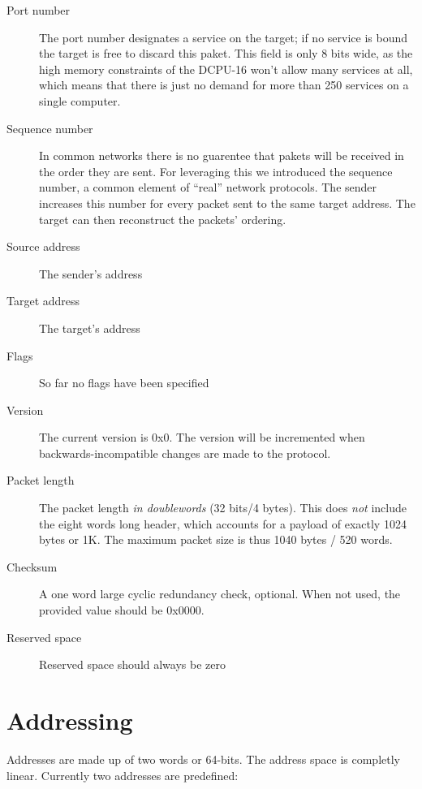 \documentclass[12pt,a4paper,english,DIV=15,oneside,parskip=half]{scrartcl}
\begin{document}
\begin{description}
\item[Port number] The port number designates a service on the target; if no service is bound the target is free to discard this paket. This field is only 8 bits wide, as the high memory constraints of the DCPU-16 won\rq{}t allow many services at all, which means that there is just no demand for more than 250 services on a single computer.

\item[Sequence number] In common networks there is no guarentee that pakets will be received in the order they are sent. For leveraging this we introduced the sequence number, a common element of \enquote{real} network protocols. The sender increases this number for every packet sent to the same target address. The target can then reconstruct the packets\rq{} ordering.

\item[Source address] The sender\rq{}s address

\item[Target address] The target\rq{}s address

\item[Flags] So far no flags have been specified

\item[Version] The current version is 0x0. The version will be incremented when backwards-incompatible changes are made to the protocol.

\item[Packet length] The packet length \emph{in doublewords} (32 bits/4 bytes). This does \emph{not} include the eight words long header, which accounts for a payload of exactly 1024 bytes or 1K. The maximum packet size is thus 1040 bytes / 520 words.

\item[Checksum] A one word large cyclic redundancy check, optional. When not used, the provided value should be 0x0000.

\item[Reserved space] Reserved space should always be zero
\end{description}

\section{Addressing}

Addresses are made up of two words or 64-bits. The address space is completly linear. Currently two addresses are predefined:
\end{document}
